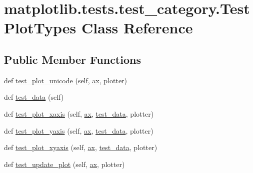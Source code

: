 \hypertarget{classmatplotlib_1_1tests_1_1test__category_1_1TestPlotTypes}{}\section{matplotlib.\+tests.\+test\+\_\+category.\+Test\+Plot\+Types Class Reference}
\label{classmatplotlib_1_1tests_1_1test__category_1_1TestPlotTypes}
\subsection*{Public Member Functions}
\begin{DoxyCompactItemize}
\item 
def \hyperlink{classmatplotlib_1_1tests_1_1test__category_1_1TestPlotTypes_a2b5ca6d7c1b0cb974ae60375f3097101}{test\+\_\+plot\+\_\+unicode} (self, \hyperlink{namespacematplotlib_1_1tests_1_1test__category_ac4a78c2ee1d8720275b6d0ca5dee3c1c}{ax}, plotter)
\item 
def \hyperlink{classmatplotlib_1_1tests_1_1test__category_1_1TestPlotTypes_a5c42a8edc6902984ab4925c00967a293}{test\+\_\+data} (self)
\item 
def \hyperlink{classmatplotlib_1_1tests_1_1test__category_1_1TestPlotTypes_a260f4fa02d2eef974eb5b87766654bdd}{test\+\_\+plot\+\_\+xaxis} (self, \hyperlink{namespacematplotlib_1_1tests_1_1test__category_ac4a78c2ee1d8720275b6d0ca5dee3c1c}{ax}, \hyperlink{classmatplotlib_1_1tests_1_1test__category_1_1TestPlotTypes_a5c42a8edc6902984ab4925c00967a293}{test\+\_\+data}, plotter)
\item 
def \hyperlink{classmatplotlib_1_1tests_1_1test__category_1_1TestPlotTypes_a1b394c0a40b570380771a1dd2c911bb8}{test\+\_\+plot\+\_\+yaxis} (self, \hyperlink{namespacematplotlib_1_1tests_1_1test__category_ac4a78c2ee1d8720275b6d0ca5dee3c1c}{ax}, \hyperlink{classmatplotlib_1_1tests_1_1test__category_1_1TestPlotTypes_a5c42a8edc6902984ab4925c00967a293}{test\+\_\+data}, plotter)
\item 
def \hyperlink{classmatplotlib_1_1tests_1_1test__category_1_1TestPlotTypes_a00987b7e3927b68472b6577c11b196b6}{test\+\_\+plot\+\_\+xyaxis} (self, \hyperlink{namespacematplotlib_1_1tests_1_1test__category_ac4a78c2ee1d8720275b6d0ca5dee3c1c}{ax}, \hyperlink{classmatplotlib_1_1tests_1_1test__category_1_1TestPlotTypes_a5c42a8edc6902984ab4925c00967a293}{test\+\_\+data}, plotter)
\item 
def \hyperlink{classmatplotlib_1_1tests_1_1test__category_1_1TestPlotTypes_a7c21ae39d7c1097d51dc5033f50090d0}{test\+\_\+update\+\_\+plot} (self, \hyperlink{namespacematplotlib_1_1tests_1_1test__category_ac4a78c2ee1d8720275b6d0ca5dee3c1c}{ax}, plotter)

\end{DoxyCompactItemize}
